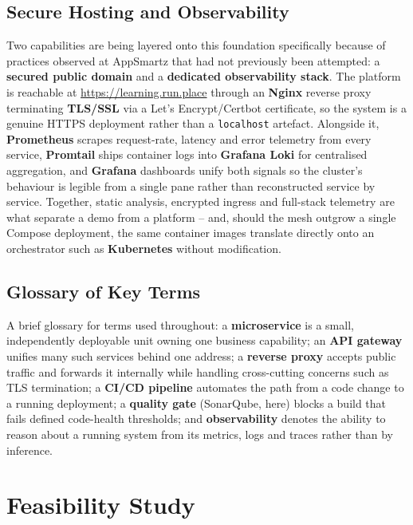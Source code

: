 \documentclass[12pt,a4paper]{article}
\begin{document}
\subsection{Secure Hosting and Observability}

Two capabilities are being layered onto this foundation specifically because
of practices observed at AppSmartz that had not previously been attempted: a
\textbf{secured public domain} and a \textbf{dedicated observability stack}.
The platform is reachable at \url{https://learning.run.place} through an
\textbf{Nginx} reverse proxy terminating \textbf{TLS/SSL} via a Let's
Encrypt/Certbot certificate, so the system is a genuine HTTPS deployment
rather than a \texttt{localhost} artefact. Alongside it, \textbf{Prometheus}
scrapes request-rate, latency and error telemetry from every service,
\textbf{Promtail} ships container logs into \textbf{Grafana Loki} for
centralised aggregation, and \textbf{Grafana} dashboards unify both signals
so the cluster's behaviour is legible from a single pane rather than
reconstructed service by service. Together, static analysis, encrypted
ingress and full-stack telemetry are what separate a demo from a platform --
and, should the mesh outgrow a single Compose deployment, the same
container images translate directly onto an orchestrator such as
\textbf{Kubernetes} without modification.

\subsection{Glossary of Key Terms}

A brief glossary for terms used throughout: a \textbf{microservice} is a
small, independently deployable unit owning one business capability; an
\textbf{API gateway} unifies many such services behind one address; a
\textbf{reverse proxy} accepts public traffic and forwards it internally
while handling cross-cutting concerns such as TLS termination; a
\textbf{CI/CD pipeline} automates the path from a code change to a running
deployment; a \textbf{quality gate} (SonarQube, here) blocks a build that
fails defined code-health thresholds; and \textbf{observability} denotes the
ability to reason about a running system from its metrics, logs and traces
rather than by inference.

\clearpage
\section{Feasibility Study}
\end{document}
